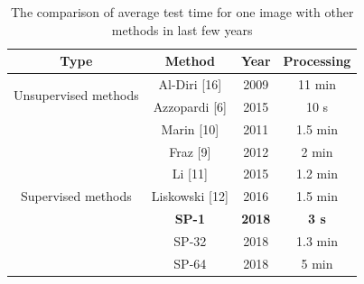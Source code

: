 \documentclass{article}
\begin{document}
\begin{appendices}
\begin{table}[h]
\centering
\caption{The comparison of average test time for one image with other methods in last few years}
\label{my-label}
\begin{tabular}{@{}cccc@{}}
\toprule
Type                                  & Method             & Year & Processing \\ \midrule
\multirow{2}{*}{Unsupervised methods} & Al-Diri {[}16{]}   & 2009 & 11 min     \\ \cmidrule(l){2-4} 
                                      & Azzopardi {[}6{]} & 2015 & 10 s       \\ \midrule
\multirow{7}{*}{Supervised methods}   & Marin {[}10{]}     & 2011 & 1.5 min    \\ \cmidrule(l){2-4} 
                                      & Fraz {[}9{]}      & 2012 & 2 min      \\ \cmidrule(l){2-4} 
                                      & Li {[}11{]}        & 2015 & 1.2 min    \\ \cmidrule(l){2-4} 
                                      & Liskowski {[}12{]} & 2016 & 1.5 min    \\ \cmidrule(l){2-4} 
                                      & \textbf{SP-1}      & \textbf{2018} & \textbf{3 s}        \\ \cmidrule(l){2-4} 
                                      & SP-32              & 2018 & 1.3 min    \\ \cmidrule(l){2-4} 
                                      & SP-64              & 2018 & 5 min      \\ \bottomrule
\end{tabular}
\end{table}

\end{appendices}  
\end{document}
